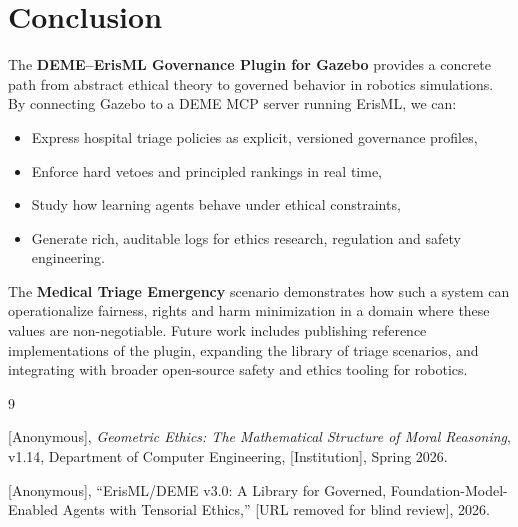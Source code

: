 \documentclass[11pt]{article}
\begin{document}
\section{Conclusion}

The \textbf{DEME--ErisML Governance Plugin for Gazebo} provides a concrete path from abstract ethical theory to governed behavior in robotics simulations. By connecting Gazebo to a DEME MCP server running ErisML, we can:

\begin{itemize}
  \item Express hospital triage policies as explicit, versioned governance profiles,
  \item Enforce hard vetoes and principled rankings in real time,
  \item Study how learning agents behave under ethical constraints,
  \item Generate rich, auditable logs for ethics research, regulation and safety engineering.
\end{itemize}

The \textbf{Medical Triage Emergency} scenario demonstrates how such a system can operationalize fairness, rights and harm minimization in a domain where these values are non-negotiable. Future work includes publishing reference implementations of the plugin, expanding the library of triage scenarios, and integrating with broader open-source safety and ethics tooling for robotics.

\begin{thebibliography}{9}

[Anonymous], \emph{Geometric Ethics: The Mathematical Structure of Moral Reasoning}, v1.14, Department of Computer Engineering, [Institution], Spring 2026.

[Anonymous], ``ErisML/DEME v3.0: A Library for Governed, Foundation-Model-Enabled Agents with Tensorial Ethics,'' [URL removed for blind review], 2026.

\end{thebibliography}
\end{document}

